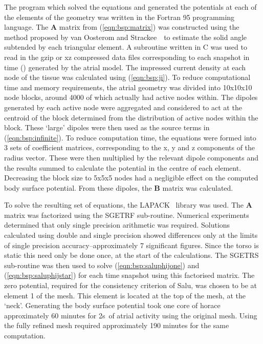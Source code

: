 The program which solved the equations and generated the potentials at each of
the elements of the geometry was written in the Fortran 95 programming language.
The $\mathbf{A}$ matrix from (\ref{eqn:bsp:matrix}) was constructed using the
method proposed by van Oosterom and Strackee~\cite{Oosterom1983}\ to
estimate the solid angle subtended by each triangular element.
A subroutine written in C was used to read in the gzip or xz compressed
data files corresponding to each snapshot in time () generated by the
atrial model.
The impressed current density at each node of the tissue was calculated using
(\ref{eqn:bsp:ji}).
To reduce computational time and memory requirements, the atrial geometry was
divided into 10x10x10 node blocks, around 4000 of which actually had active
nodes within.
The dipoles generated by each active node were aggregated and considered to act
at the centroid of the block determined from the distribution of active nodes
within the block.
These `large' dipoles were then used as the source terms in
(\ref{eqn:bsp:infinite}).
To reduce computation time, the equations were formed into 3 sets of coefficient
matrices, corresponding to the x, y and z components of the radius vector.
These were then multiplied by the relevant dipole components and the results
summed to calculate the potential in the centre of each element.
Decreasing the block size to 5x5x5 nodes had a negligible effect on the computed
body surface potential.
From these dipoles, the $\mathbf{B}$ matrix was calculated.

To solve the resulting set of equations, the LAPACK~\cite{lapack} library was
used.
The $\mathbf{A}$ matrix was factorized using the SGETRF sub-routine.
Numerical experiments determined that only single precision arithmetic was
required.
Solutions calculated using double and single precision showed differences only at
the limits of single precision accuracy--approximately 7 significant figures.
Since the torso is static this need only be done once, at the start of the
calculations.
The SGETRS sub-routine was then used to solve (\ref{eqn:bsp:saluphijone}) and
(\ref{eqn:bsp:saluphijstar}) for each time snapshot using this factorised
matrix.
The zero potential, required for the consistency criterion of Salu, was chosen
to be at element 1 of the mesh.
This element is located at the top of the mesh, at the `neck'.
Generating the body surface potential took one core of horace approximately 60
minutes for \unit{2}{s}\ of atrial activity using the original mesh.
Using the fully refined mesh required approximately 190 minutes for the same
computation.

